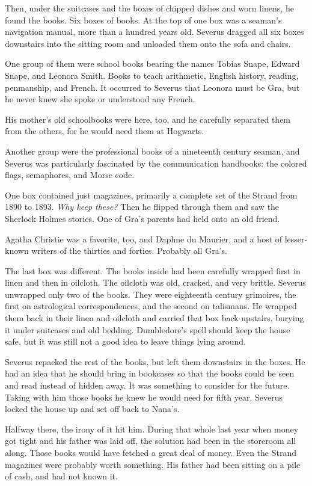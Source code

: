 Then, under the suitcases and the boxes of chipped dishes and worn linens, he found the books. Six boxes of books. At the top of one box was a seaman's navigation manual, more than a hundred years old. Severus dragged all six boxes downstairs into the sitting room and unloaded them onto the sofa and chairs.

One group of them were school books bearing the names Tobias Snape, Edward Snape, and Leonora Smith. Books to teach arithmetic, English history, reading, penmanship, and French. It occurred to Severus that Leonora must be Gra, but he never knew she spoke or understood any French.

His mother's old schoolbooks were here, too, and he carefully separated them from the others, for he would need them at Hogwarts.

Another group were the professional books of a nineteenth century seaman, and Severus was particularly fascinated by the communication handbooks: the colored flags, semaphores, and Morse code.

One box contained just magazines, primarily a complete set of the Strand from 1890 to 1893. \emph{Why keep these?} Then he flipped through them and saw the Sherlock Holmes stories. One of Gra's parents had held onto an old friend.

Agatha Christie was a favorite, too, and Daphne du Maurier, and a host of lesser-known writers of the thirties and forties. Probably all Gra's.

The last box was different. The books inside had been carefully wrapped first in linen and then in oilcloth. The oilcloth was old, cracked, and very brittle. Severus unwrapped only two of the books. They were eighteenth century grimoires, the first on astrological correspondences, and the second on talismans. He wrapped them back in their linen and oilcloth and carried that box back upstairs, burying it under suitcases and old bedding. Dumbledore's spell should keep the house safe, but it was still not a good idea to leave things lying around.

Severus repacked the rest of the books, but left them downstairs in the boxes. He had an idea that he should bring in bookcases so that the books could be seen and read instead of hidden away. It was something to consider for the future. Taking with him those books he knew he would need for fifth year, Severus locked the house up and set off back to Nana's.

Halfway there, the irony of it hit him. During that whole last year when money got tight and his father was laid off, the solution had been in the storeroom all along. Those books would have fetched a great deal of money. Even the Strand magazines were probably worth something. His father had been sitting on a pile of cash, and had not known it.

